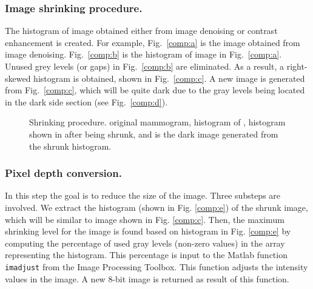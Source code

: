 \subsubsection{Image shrinking procedure.} 

The histogram of image obtained either from image denoising or contrast
enhancement is created. For example, Fig.~\ref{comp:a} is the image obtained
from image denoising. Fig.~\ref{comp:b} is the histogram of image in
Fig.~\ref{comp:a}. Unused grey levels (or gaps) in Fig.~\ref{comp:b} are
eliminated. As a result, a right-skewed histogram is obtained, shown in
Fig.~\ref{comp:c}. A new image is generated from Fig.~\ref{comp:c}, which will
be quite dark due to the gray levels being located in the dark side section
(see Fig.~\ref{comp:d}).

\begin{figure}[h]
  \begin{center}
    \hspace{12pt}
    \hspace{12pt}
    \hspace{12pt}
  \end{center}

  \caption{Shrinking procedure. \protect{} original mammogram,
  \protect{} histogram of \protect{},
  \protect{} histogram shown in \protect{} after
  being shrunk, and \protect{} is the dark image generated from
  the shrunk histogram.} 
  
  \label{img:shrinking-one} 
\end{figure}

\subsubsection{Pixel depth conversion.} 

In this step the goal is to reduce the size of the image. Three substeps are
involved. We extract the histogram (shown in Fig. \ref{comp:e}) of the shrunk
image, which will be similar to image shown in Fig. \ref{comp:c}. Then, the
maximum shrinking level for the image is found based on histogram in Fig.
\ref{comp:e} by computing the percentage of used gray levels (non-zero values)
in the array representing the histogram. This percentage is input to the Matlab
function \texttt{imadjust} from the Image Processing Toolbox. This function
adjusts the intensity values in the image. A new 8-bit image is returned as
result of this function. 

